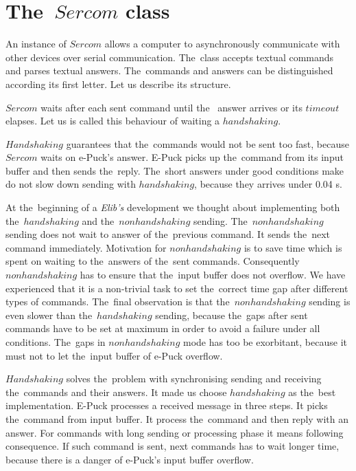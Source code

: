 \section{The~$Sercom$ class}\label{sec:sercom}
  An instance of $Sercom$ allows a computer to asynchronously communicate with other devices
  over serial communication. The~class accepts textual commands and parses textual answers.
  The~commands and answers can be distinguished according its first letter.
  Let us describe its structure.
 
  \begin{definition}
  $Sercom$ waits after each sent command until the~ answer arrives or its $timeout$ elapses.
  Let us is called this behaviour of waiting a $handshaking$.
  \end{definition}

  $Handshaking$ guarantees that the~commands would not be sent too fast,
  because $Sercom$ waits on e-Puck's answer. E-Puck picks up the~command from its input buffer and then sends the~reply.
  The~short answers under good conditions make do not slow down sending with $handshaking$, because
  they arrives under 0.04 s. 


  At the~beginning of a {\it Elib's} development we thought about implementing both the~$handshaking$
  and the~$nonhandshaking$ sending.
  The~$nonhandshaking$ sending does not wait to answer of the~previous command. It sends the~next command immediately. 
  Motivation for $nonhandshaking$ is to save time which is spent on waiting to the~answers of the~sent commands.
  Consequently $nonhandshaking$ has to ensure that the~input buffer does not overflow.
  We have experienced that it is a non-trivial task to set the~correct time gap after different types of commands. 
  The~final observation is that the~$nonhandshaking$ sending is even slower than the~$handshaking$ sending, 
  because the~gaps after sent commands have to be set at maximum in order to avoid a failure under all conditions. 
  The~gaps in $nonhandshaking$ mode has too be exorbitant, 
  because it must not to let the~input buffer of e-Puck overflow.

  $Handshaking$ solves the~problem with synchronising sending and receiving the~commands and their answers. 
  It made us choose $handshaking$ as the~best implementation.
  E-Puck processes a received message in three steps. It picks the~command from input buffer.
  It process the~command and then reply with an answer.
  For commands with long sending or processing phase it means following consequence.
  If such command is sent, next commands has to wait longer time, because there is a
  danger of e-Puck's input buffer overflow.

